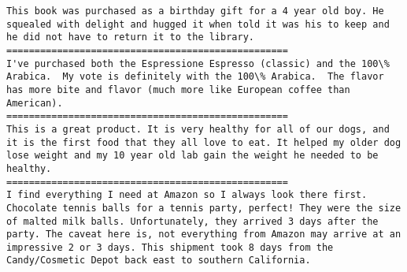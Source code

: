 \documentclass[11pt]{article}
\begin{document}
    \begin{Verbatim}[commandchars=\\\{\}]
This book was purchased as a birthday gift for a 4 year old boy. He squealed with delight and hugged it when told it was his to keep and he did not have to return it to the library.
==================================================
I've purchased both the Espressione Espresso (classic) and the 100\% Arabica.  My vote is definitely with the 100\% Arabica.  The flavor has more bite and flavor (much more like European coffee than American).
==================================================
This is a great product. It is very healthy for all of our dogs, and it is the first food that they all love to eat. It helped my older dog lose weight and my 10 year old lab gain the weight he needed to be healthy.
==================================================
I find everything I need at Amazon so I always look there first. Chocolate tennis balls for a tennis party, perfect! They were the size of malted milk balls. Unfortunately, they arrived 3 days after the party. The caveat here is, not everything from Amazon may arrive at an impressive 2 or 3 days. This shipment took 8 days from the Candy/Cosmetic Depot back east to southern California.

    \end{Verbatim}
\end{document}
